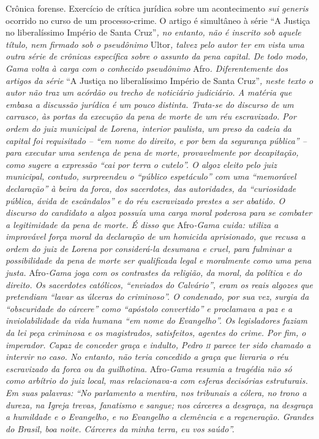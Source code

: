 \begin{didascalia}
Crônica forense. Exercício de crítica jurídica sobre um
acontecimento\emph{ sui generis }ocorrido no curso de um processo-crime.
O artigo é simultâneo à série ``A Justiça no liberalíssimo Império de
Santa Cruz''\emph{, no entanto, não é inscrito sob aquele título, nem
firmado sob o pseudônimo} Ultor\emph{, talvez pelo autor ter em vista
uma outra série de crônicas específica sobre o assunto da pena capital.
De todo modo, Gama volta à carga com o conhecido pseudônimo} Afro\emph{.
Diferentemente dos artigos da série} ``A Justiça no liberalíssimo Império
de Santa Cruz''\emph{, neste texto o autor não traz um acórdão ou trecho
de noticiário judiciário. A matéria que embasa a discussão jurídica é um
pouco distinta. Trata-se do discurso de um carrasco, às portas da
execução da pena de morte de um réu escravizado. Por ordem do juiz
municipal de Lorena, interior paulista, um preso da cadeia da capital
foi requisitado -- ``em nome do direito, e por bem da segurança pública''
-- para executar uma sentença de pena de morte, provavelmente por
decapitação, como sugere a expressão ``cai por terra o cutelo''. O algoz
eleito pelo juiz municipal, contudo, surpreendeu o ``público espetáculo''
com uma ``memorável declaração'' à beira da forca, dos sacerdotes, das
autoridades, da ``curiosidade pública, ávida de escândalos'' e do réu
escravizado prestes a ser abatido. O discurso do candidato a algoz
possuía uma carga moral poderosa para se combater a legitimidade da pena
de morte. É disso que} Afro\emph{-Gama cuida: utiliza a improvável força
moral da declaração de um homicida aprisionado, que recusa a ordem do
juiz de Lorena por considerá-la desumana e cruel, para fulminar a
possibilidade da pena de morte ser qualificada legal e moralmente como
uma pena justa.} Afro\emph{-Gama joga com os contrastes da religião, da
moral, da política e do direito. Os sacerdotes católicos, ``enviados do
Calvário'', eram os reais algozes que pretendiam ``lavar as úlceras do
criminoso''. O condenado, por sua vez, surgia da ``obscuridade do cárcere''
como ``apóstolo convertido'' e proclamava a paz e a inviolabilidade da
vida humana ``em nome do Evangelho''. Os legisladores faziam da lei peça
criminosa e os magistrados, satisfeitos, agentes do crime. Por fim, o
imperador. Capaz de conceder graça e indulto, Pedro \textsc{ii} parece ter sido
chamado a intervir no caso. No entanto, não teria concedido a graça que
livraria o réu escravizado da forca ou da guilhotina.} Afro\emph{-Gama
resumia a tragédia não só como arbítrio do juiz local, mas relacionava-a
com esferas decisórias estruturais. Em suas palavras: ``No parlamento a
mentira, nos tribunais a cólera, no trono a dureza, na Igreja trevas,
fanatismo e sangue; nos cárceres a desgraça, na desgraça a humildade e o
Evangelho, e no Evangelho a clemência e a regeneração. Grandes do
Brasil, boa noite. Cárceres da minha terra, eu vos saúdo''.}
\end{didascalia}



